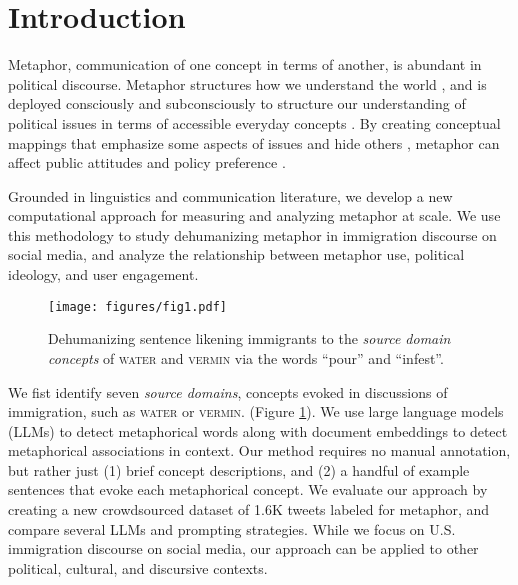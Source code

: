 



\section{Introduction}


Metaphor, communication of one concept in terms of another, is abundant in political discourse. %
Metaphor structures how we understand the world \citep{lakoff1980metaphors}, and is deployed consciously and subconsciously to structure our understanding of political issues in terms of accessible everyday concepts \citep{burgers_figurative_2016}. By creating conceptual mappings that emphasize some aspects of issues and hide others \citep{lakoff1980metaphors}, metaphor can affect public attitudes and policy preference \citep{boeynaems_effects_2017}. 

Grounded in linguistics and communication literature, we develop a new computational approach for measuring and analyzing metaphor at scale. We use this methodology to study dehumanizing metaphor in immigration discourse on social media, and analyze the relationship between metaphor use, political ideology, and user engagement. 



\begin{figure}
    \centering
    \texttt{[image: figures/fig1.pdf]}
    \caption{Dehumanizing sentence likening immigrants to the \textit{source domain concepts} of \textsc{water} and \textsc{vermin} via the words ``pour'' and ``infest''.}
    \label{fig:intro}
\end{figure}


We fist identify seven \textit{source domains}, concepts evoked in discussions of immigration, such as \textsc{water} or \textsc{vermin}.  (Figure \ref{fig:intro}). 
We use large language models (LLMs) to detect metaphorical words along with document embeddings to detect metaphorical associations in context. Our method requires no manual annotation, but rather just (1) brief concept descriptions, and (2) a handful of example sentences that evoke each metaphorical concept. We evaluate our approach by creating a new crowdsourced dataset of 1.6K tweets labeled for metaphor, and compare several LLMs and prompting strategies. While we focus on U.S. immigration discourse on social media, our approach can be applied to 
other political, cultural, and discursive contexts.


